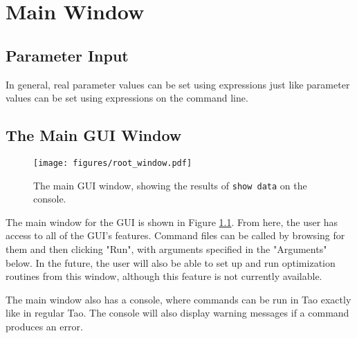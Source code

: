 \chapter{Main Window}

\section{Parameter Input}
\label{s:param.input}

In general, real parameter values can be set using expressions just like parameter values can be set
using expressions on the \tao command line.

\section{The Main GUI Window}
\label{s:gui.root.window}

\begin{figure}
\centering
\texttt{[image: figures/root\_window.pdf]}
\caption[The main GUI window.]{The main GUI window, showing the results of \texttt{show data} on the console.}
\label{fig:root.window}
\end{figure}

The main window for the GUI is shown in Figure \ref{fig:root.window}.
From here, the user has access to all of the GUI's features.
Command files can be called by browsing for them and then clicking "Run", with arguments specified in the "Arguments" below.
In the future, the user will also be able to set up and run optimization routines from this window, although this feature is not currently available.

The main window also has a console, where commands can be run in Tao exactly like in regular Tao.
The console will also display warning messages if a command produces an error.


